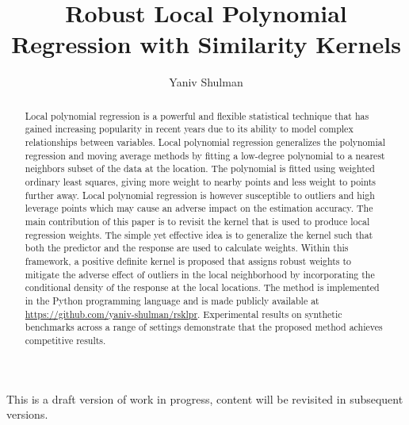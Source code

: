 \documentclass[preprint,1p,times]{elsarticle}
\begin{document}
\begin{frontmatter}

\vspace*{\fill}
\begin{center}
This is a draft version of work in progress, content will be revisited in subsequent versions.
\end{center}
\vspace*{\fill}
    
\title{Robust Local Polynomial Regression with Similarity Kernels}
\author{Yaniv Shulman}
\address{yaniv@aleph-zero.info}


\begin{abstract}
Local polynomial regression is a powerful and flexible statistical technique that has gained increasing popularity in recent years due to its ability to model complex relationships between variables. Local polynomial regression generalizes the polynomial regression and moving average methods by fitting a low-degree polynomial to a nearest neighbors subset of the data at the location. The polynomial is fitted using weighted ordinary least squares, giving more weight to nearby points and less weight to points further away. Local polynomial regression is however susceptible to outliers and high leverage points which may cause an adverse impact on the estimation accuracy. The main contribution of this paper is to revisit the kernel that is used to produce local regression weights. The simple yet effective idea is to generalize the kernel such that both the predictor and the response are used to calculate weights. Within this framework, a positive definite kernel is proposed that assigns robust weights to mitigate the adverse effect of outliers in the local neighborhood by incorporating the conditional density of the response at the local locations. The method is implemented in the Python programming language and is made publicly available at \url{https://github.com/yaniv-shulman/rsklpr}. Experimental results on synthetic benchmarks across a range of settings demonstrate that the proposed method achieves competitive results.
\end{abstract}
\end{frontmatter}
\end{document}
